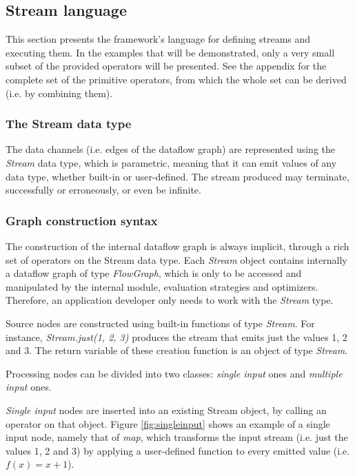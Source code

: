 \documentclass[sigplan,review,anonymous]{acmart}\settopmatter{printfolios=true}
\begin{document}

\subsection{Stream language}
This section presents the framework's language for defining streams and executing them. In the examples that will be demonstrated, only a very small subset of the provided operators will be presented. See the appendix for the complete set of the primitive operators, from which the whole set can be derived (i.e. by combining them).

\subsubsection{The Stream data type}

The data channels (i.e. edges of the dataflow graph) are represented using the \textit{Stream} data type, which is parametric, meaning that it can emit values of any data type, whether built-in or user-defined. The stream produced may terminate, successfully or erroneously, or even be infinite.

\subsubsection{Graph construction syntax}

The construction of the internal dataflow graph is always implicit, through a rich set of operators on the Stream data type. Each \textit{Stream} object contains internally a dataflow graph of type \textit{FlowGraph}, which is only to be accessed and manipulated by the internal module, evaluation strategies and optimizers. Therefore, an application developer only needs to work with the \textit{Stream} type.

Source nodes are constructed using built-in functions of type \textit{Stream}. For instance, \textit{Stream.just(1, 2, 3)} produces the stream that emits just the values 1, 2 and 3. The return variable of these creation function is an object of type \textit{Stream}.

Processing nodes can be divided into two classes: \textit{single input} ones and \textit{multiple input} ones. 

\textit{Single input} nodes are inserted into an existing Stream object, by calling an operator on that object. Figure \ref{fig:singleinput} shows an example of a single input node, namely that of \textit{map}, which transforms the input stream (i.e. just the values 1, 2 and 3) by applying a user-defined function to every emitted value (i.e. $f(x)=x+1$).
\end{document}
